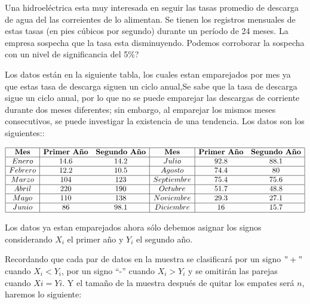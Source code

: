\documentclass[a4paper,oneside,openany]{book}
\begin{document}
Una hidroeléctrica esta muy interesada en seguir las tasas promedio de
descarga de agua del las correientes de lo alimentan. Se tienen los
registros mensuales de estas tasas (en pies cúbicos por segundo) durante
un período de 24 meses. La empresa sospecha que la tasa esta
disminuyendo. Podemos corroborar la sospecha con un nivel de
significancia del 5\%?

Los datos están en la siguiente tabla, los cuales estan emparejados por
mes ya que estas tasa de descarga siguen un ciclo anual,Se sabe que la
tasa de descarga sigue un ciclo anual, por lo que no se puede emparejar
las descargas de corriente durante dos meses diferentes; sin embargo, al
emparejar los mismos meses consecutivos, se puede investigar la
existencia de una tendencia. Los datos son los siguientes::

\[
\begin{equation*}
\begin{array}{|c| c c|c| c c|} 
\hline
\textbf{Mes} & \textbf{Primer Año} & \textbf{Segundo Año} & \textbf{Mes} & \textbf{Primer Año} & \textbf{Segundo Año}\\
\hline
Enero & 14.6 & 14.2 & Julio & 92.8 & 88.1 \\
\hline
Febrero&12.2&10.5&Agosto&74.4&80 \\
\hline
Marzo&104&123&Septiembre&75.4&75.6 \\
\hline
Abril&220&190&Octubre&51.7&48.8 \\
\hline
Mayo&110&138&Noviembre&29.3&27.1 \\
\hline
Junio&86&98.1&Diciembre&16&15.7 \\
\hline
\end{array}
\end{equation*}
\]

Los datos ya estan emparejados ahora sólo debemos asignar los signos
considerando \(X_i\) el primer año y \(Y_i\) el segundo año.

Recordando que cada par de datos en la muestra se clasificará por un
signo \("+"\) cuando \(X_{i} < Y_{i}\), por un signo ``-'' cuando
\(X_{i} > Y_{i}\) y se omitirán las parejas cuando \(Xi = Yi\). Y el
tamaño de la muestra después de quitar los empates será \(n\), haremos
lo siguiente:
\end{document}
